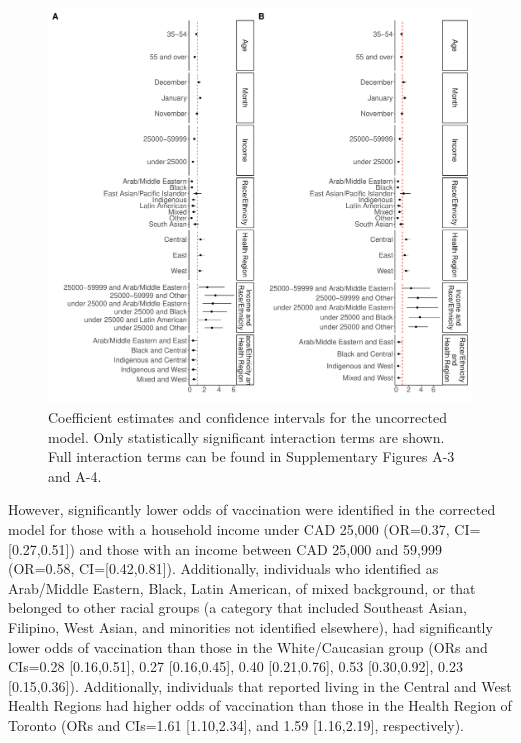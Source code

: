 \documentclass[
  letterpaper,
  DIV=11,
  numbers=noendperiod]{scrartcl}
\begin{document}
\begin{figure}

\includegraphics{main_files/figure-pdf/fig-models-1.pdf} \hfill{}

\caption{\label{fig-models}Coefficient estimates and confidence
intervals for the uncorrected model. Only statistically significant
interaction terms are shown. Full interaction terms can be found in
Supplementary Figures A-3 and A-4.}

\end{figure}

However, significantly lower odds of vaccination were identified in the
corrected model for those with a household income under CAD 25,000
(OR=0.37, CI={[}0.27,0.51{]}) and those with an income between CAD
25,000 and 59,999 (OR=0.58, CI={[}0.42,0.81{]}). Additionally,
individuals who identified as Arab/Middle Eastern, Black, Latin
American, of mixed background, or that belonged to other racial groups
(a category that included Southeast Asian, Filipino, West Asian, and
minorities not identified elsewhere), had significantly lower odds of
vaccination than those in the White/Caucasian group (ORs and CIs=0.28
{[}0.16,0.51{]}, 0.27 {[}0.16,0.45{]}, 0.40 {[}0.21,0.76{]}, 0.53
{[}0.30,0.92{]}, 0.23 {[}0.15,0.36{]}). Additionally, individuals that
reported living in the Central and West Health Regions had higher odds
of vaccination than those in the Health Region of Toronto (ORs and
CIs=1.61 {[}1.10,2.34{]}, and 1.59 {[}1.16,2.19{]}, respectively).
\end{document}
